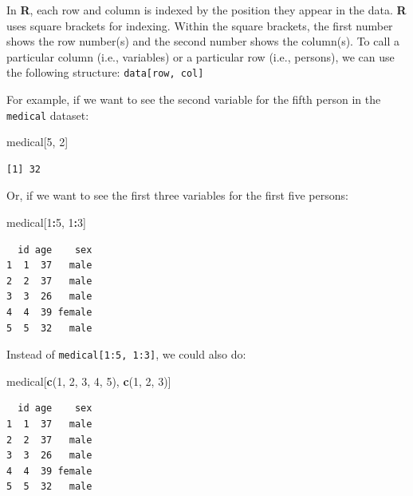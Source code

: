 \documentclass[]{book}
\newenvironment{Shaded}{\begin{snugshade}}{\end{snugshade}}
\newcommand{\DecValTok}[1]{\textcolor[rgb]{0.00,0.00,0.81}{#1}}
\newcommand{\KeywordTok}[1]{\textcolor[rgb]{0.13,0.29,0.53}{\textbf{#1}}}
\newcommand{\NormalTok}[1]{#1}
\newcommand{\OperatorTok}[1]{\textcolor[rgb]{0.81,0.36,0.00}{\textbf{#1}}}
\begin{document}
In \textbf{R}, each row and column is indexed by the position they appear in the data. \textbf{R} uses square brackets for indexing. Within the square brackets, the first number shows the row number(s) and the second number shows the column(s). To call a particular column (i.e., variables) or a particular row (i.e., persons), we can use the following structure: \texttt{data{[}row,\ col{]}}

For example, if we want to see the second variable for the fifth person in the \texttt{medical} dataset:

\begin{Shaded}
\begin{Highlighting}[]
\NormalTok{medical[}\DecValTok{5}\NormalTok{, }\DecValTok{2}\NormalTok{]}
\end{Highlighting}
\end{Shaded}

\begin{verbatim}
[1] 32
\end{verbatim}

Or, if we want to see the first three variables for the first five persons:

\begin{Shaded}
\begin{Highlighting}[]
\NormalTok{medical[}\DecValTok{1}\OperatorTok{:}\DecValTok{5}\NormalTok{, }\DecValTok{1}\OperatorTok{:}\DecValTok{3}\NormalTok{]}
\end{Highlighting}
\end{Shaded}

\begin{verbatim}
  id age    sex
1  1  37   male
2  2  37   male
3  3  26   male
4  4  39 female
5  5  32   male
\end{verbatim}

Instead of \texttt{medical{[}1:5,\ 1:3{]}}, we could also do:

\begin{Shaded}
\begin{Highlighting}[]
\NormalTok{medical[}\KeywordTok{c}\NormalTok{(}\DecValTok{1}\NormalTok{, }\DecValTok{2}\NormalTok{, }\DecValTok{3}\NormalTok{, }\DecValTok{4}\NormalTok{, }\DecValTok{5}\NormalTok{), }\KeywordTok{c}\NormalTok{(}\DecValTok{1}\NormalTok{, }\DecValTok{2}\NormalTok{, }\DecValTok{3}\NormalTok{)]}
\end{Highlighting}
\end{Shaded}

\begin{verbatim}
  id age    sex
1  1  37   male
2  2  37   male
3  3  26   male
4  4  39 female
5  5  32   male
\end{verbatim}
\end{document}
